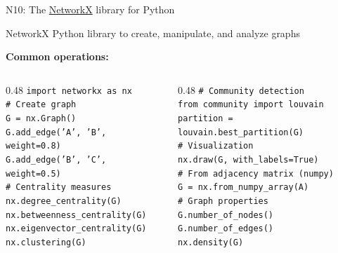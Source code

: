 \documentclass[aspectratio=169, 10pt]{beamer}
\begin{document}
\begin{frame}{N10: The \href{https://networkx.org/}{NetworkX} library for Python}
    
    \begin{block}{NetworkX}
        Python library to create, manipulate, and analyze graphs
    \end{block}
    
    \vspace{2mm}
    
    \textbf{Common operations:}
    
    \begin{columns}
        \begin{column}{0.48\textwidth}
            \texttt{\small import networkx as nx} \\[2mm]
            \texttt{\small \# Create graph} \\
            \texttt{\small G = nx.Graph()} \\
            \texttt{\small G.add\_edge('A', 'B', weight=0.8)} \\
            \texttt{\small G.add\_edge('B', 'C', weight=0.5)} \\[2mm]
            \texttt{\small \# Centrality measures} \\
            \texttt{\small nx.degree\_centrality(G)} \\
            \texttt{\small nx.betweenness\_centrality(G)} \\
            \texttt{\small nx.eigenvector\_centrality(G)} \\
            \texttt{\small nx.clustering(G)}
        \end{column}
        
        \begin{column}{0.48\textwidth}
            \texttt{\small \# Community detection} \\
            \texttt{\small from community import louvain} \\
            \texttt{\small partition = louvain.best\_partition(G)} \\[2mm]
            \texttt{\small \# Visualization} \\
            \texttt{\small nx.draw(G, with\_labels=True)} \\[2mm]
            \texttt{\small \# From adjacency matrix (numpy)} \\
            \texttt{\small G = nx.from\_numpy\_array(A)} \\[2mm]
            \texttt{\small \# Graph properties} \\
            \texttt{\small G.number\_of\_nodes()} \\
            \texttt{\small G.number\_of\_edges()} \\
            \texttt{\small nx.density(G)}
        \end{column}
    \end{columns}
    
\end{frame}
\end{document}
